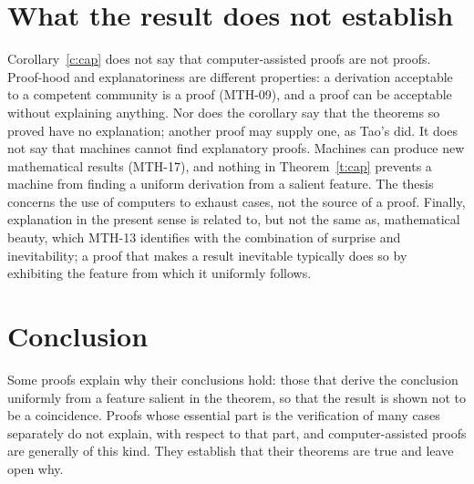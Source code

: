 \documentclass{situationist-preprint}
\begin{document}
\section{What the result does not establish}

Corollary~\ref{c:cap} does not say that computer-assisted proofs are not proofs. Proof-hood and explanatoriness are different properties: a derivation acceptable to a competent community is a proof (MTH-09), and a proof can be acceptable without explaining anything. Nor does the corollary say that the theorems so proved have no explanation; another proof may supply one, as Tao's did. It does not say that machines cannot find explanatory proofs. Machines can produce new mathematical results (MTH-17), and nothing in Theorem~\ref{t:cap} prevents a machine from finding a uniform derivation from a salient feature. The thesis concerns the use of computers to exhaust cases, not the source of a proof. Finally, explanation in the present sense is related to, but not the same as, mathematical beauty, which MTH-13 identifies with the combination of surprise and inevitability; a proof that makes a result inevitable typically does so by exhibiting the feature from which it uniformly follows.

\section{Conclusion}

Some proofs explain why their conclusions hold: those that derive the conclusion uniformly from a feature salient in the theorem, so that the result is shown not to be a coincidence. Proofs whose essential part is the verification of many cases separately do not explain, with respect to that part, and computer-assisted proofs are generally of this kind. They establish that their theorems are true and leave open why.
\end{document}
